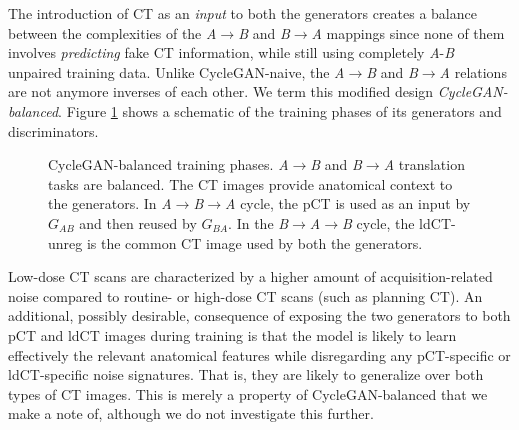 The introduction of CT as an \textit{input} to both the generators creates a balance between the complexities of the \textit{A}$\rightarrow$\textit{B} and \textit{B}$\rightarrow$\textit{A} mappings since none of them involves \textit{predicting} fake CT information, while still using completely \textit{A}-\textit{B} unpaired training data. Unlike CycleGAN-naive, the \textit{A}$\rightarrow$\textit{B} and \textit{B}$\rightarrow$\textit{A} relations are not anymore inverses of each other. We term this modified design \textit{CycleGAN-balanced}. Figure \ref{fig:cyclegan_balanced} shows a schematic of the training phases of its generators and discriminators.

\begin{figure}[h!]
    \centering
    \caption{CycleGAN-balanced training phases. \textit{A}$\rightarrow$\textit{B} and \textit{B}$\rightarrow$\textit{A} translation tasks are balanced. The CT images provide anatomical context to the generators. In \textit{A}$\rightarrow$\textit{B}$\rightarrow$\textit{A} cycle, the pCT is used as an input by $G_{AB}$ and then reused by $G_{BA}$. In the \textit{B}$\rightarrow$\textit{A}$\rightarrow$\textit{B} cycle, the ldCT-unreg is the common CT image used by both the generators.}
    \label{fig:cyclegan_balanced}
\end{figure}{}

Low-dose CT scans are characterized by a higher amount of acquisition-related noise compared to routine- or high-dose CT scans (such as planning CT). An additional, possibly desirable, consequence of exposing the two generators to both pCT and ldCT images during training is that the model is likely to learn effectively the relevant anatomical features while disregarding any pCT-specific or ldCT-specific noise signatures. That is, they are likely to generalize over both types of CT images. This is merely a property of CycleGAN-balanced that we make a note of, although we do not investigate this further.


